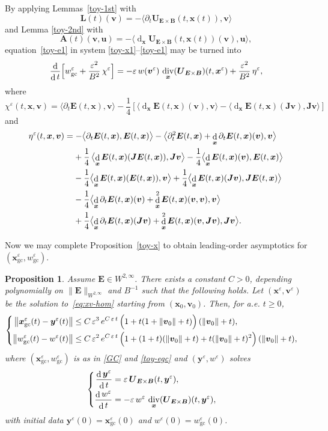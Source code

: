 \documentclass[10pt]{amsart}
\newenvironment{splitcases}
{\begin{cases}\begin{aligned}}
{\end{aligned}\end{cases}}
\newcommand{\blangle}{\bigl\langle}
\newcommand{\brangle}{\bigr\rangle}
\let\eps\varepsilon
\let\d\partial
\DeclareMathOperator\dD{d}\let\dd\dD
\DeclareMathOperator{\Div}{div}
\theoremstyle{plain}
\newtheorem{proposition}[theorem]{Proposition}
\theoremstyle{definition}
\newcommand{\be}{\begin{equation}}
\newcommand{\ee}{\end{equation}}
\newcommand{\bpr}{\begin{proposition}}
\newcommand{\epr}{\end{proposition}}
\newcommand\bA{{\boldsymbol A}}
\newcommand\bB{{\boldsymbol B}}
\newcommand\bE{{\boldsymbol E}}
\newcommand\bJ{{\boldsymbol J}}
\newcommand\bL{{\boldsymbol L}}
\newcommand\bU{{\boldsymbol U}}
\newcommand\bfu{{\boldsymbol u}}
\newcommand\bfv{{\boldsymbol v}}
\newcommand\bfx{{\boldsymbol x}}
\newcommand\bfy{{\boldsymbol y}}
\let\e w
\newcommand{\GC}{\bfx_\mathrm{gc}}
\newcommand{\eGC}{w_\mathrm{gc}}
\newcommand{\EcB}{\bU_{\bE\times\bB}}
\begin{document}
By applying Lemmas~\ref{toy-1st} with
\[
\bL(t)(\bfv)=
-\blangle\d_t\EcB(t,\bfx(t)),\bfv\brangle
\]
and Lemma \ref{toy-2nd} with
\[
\bA(t)(\bfv,\bfu) =
-\blangle\dD_\bfx\EcB(t,\bfx(t))(\bfv),\bfu\brangle,
\]
equation~\eqref{toy-e1} in system \eqref{toy-x1}--\eqref{toy-e1} may be turned into
\be
\label{toy-e2}
\frac{\dD}{\dD t}\Bigl[\eGC^\eps+\frac{\eps^2}{B^2}\,\chi^\eps\Bigr]
=-\eps\,\e(\bfv^\eps)\,\Div_\bfx(\EcB)(t,\bfx^\eps)
+\frac{\eps^2}{B^2}\,\eta^\eps,
\ee
where
\[
\chi^\eps(t,\bfx,\bfv)=\blangle\d_t\bE(t,\bfx),\bfv\brangle
-\frac14\left[\blangle\dD_\bfx\bE(t,\bfx)(\bfv),\bfv\brangle
-\blangle\dD_\bfx\bE(t,\bfx)(\bJ\bfv),\bJ\bfv\brangle\right]
\]
and
\begin{align*}
\eta^\eps(t,\bfx,\bfv)
&=-\blangle\d_t\bE(t,\bfx),\bE(t,\bfx)\brangle
-\blangle\d_t^2\bE(t,\bfx)
+\dD_\bfx\d_t\bE(t,\bfx)(\bfv),\bfv\brangle\\
&\hspace*{3.8mm}+\frac14\,\blangle\dD_\bfx\bE(t,\bfx)(\bJ\bE(t,\bfx)),\bJ\bfv\brangle
-\frac14\blangle\dD_\bfx\bE(t,\bfx)(\bfv),\bE(t,\bfx)\brangle\\
&\hspace*{3.8mm}-\frac14\blangle\dD_\bfx\bE(t,\bfx)(\bE(t,\bfx)),\bfv\brangle
+\frac14\blangle\dD_\bfx\bE(t,\bfx)(\bJ\bfv),\bJ\bE(t,\bfx)\brangle\\
&\hspace*{3.8mm}-\frac14\blangle\dD_\bfx\d_t\bE(t,\bfx)(\bfv)
+\dD_\bfx^2\bE(t,\bfx)(\bfv,\bfv),\bfv\brangle\\
&\hspace*{3.8mm}+\frac14\blangle\dD_\bfx\d_t\bE(t,\bfx)(\bJ\bfv)
+\dD_\bfx^2\bE(t,\bfx)(\bfv,\bJ\bfv),\bJ\bfv\brangle.
\end{align*}

Now we may complete Proposition~\ref{toy-x} to obtain leading-order asymptotics for $(\GC^\eps,\eGC^\eps)$.

\bpr
\label{toy-xe}
Assume $\bE\in W^{2,\infty}$. There exists a constant $C>0$, depending
polynomially on $\|\bE\|_{W^{2,\infty}}$ and $B^{-1}$ such that the following holds. Let
$(\bfx^\eps,\bfv^\eps)$ be the solution to~\eqref{eq:xv-hom} starting from
$(\bfx_0,\bfv_0)$. Then, for a.e. $t\geq0$,
\[
\begin{splitcases}
\left\|\GC^\eps(t)-\bfy^\eps(t)\right\|
&\leq C\,\eps^3\,e^{C\,\eps\,t}
\,\Bigl(1+t(1+\|\bfv_0\|+t)\Bigr)\,(\|\bfv_0\|+t),
\\
\left\|\eGC^\eps(t)-\e^\eps(t)\right\|
&\leq C\,\eps^2\,e^{C\,\eps\,t}\,
\Bigl(1+(1+t)(\|\bfv_0\|+t)+t(\|\bfv_0\|+t)^2\Bigr)\,(\|\bfv_0\|+t),
\end{splitcases}
\]
where $(\GC^\eps,\eGC^\eps)$ is as in \eqref{GC} and \eqref{toy-egc} and $(\bfy^\eps,\e^\eps)$ solves
\be
\label{eq:mhv}
\begin{splitcases}
\frac{\dD\bfy^\eps}{\dD t}&= \eps\,\EcB(t,\bfy^\eps),
\\
\frac{\dD \e^\eps}{\dD t}&=-\eps\,\e^\eps\,\Div_\bfx(\EcB)(t,\bfy^\eps),
\end{splitcases}
\ee
with initial data $\bfy^\eps(0)= \GC^\eps(0)$ and $\e^\eps(0)=\eGC^\eps(0)$.
\epr
\end{document}
